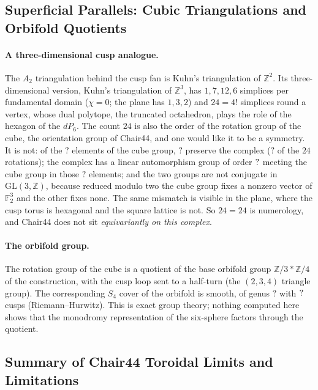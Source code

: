 \documentclass[11pt,a4paper]{article}
\newcommand{\SSChCoverGenus}{?}\newcommand{\SSChECoef}{?}
\newcommand{\SSChKuhnGroup}{?}\newcommand{\SSChKuhnMeet}{?}
\newcommand{\SSChKuhnPreserve}{?}\newcommand{\SSChKuhnRot}{?}
\newcommand{\ZZ}{\mathbb{Z}}
\newcommand{\GL}{\mathrm{GL}}
\theoremstyle{plain}
\theoremstyle{definition}
\begin{document}
\subsection{Superficial Parallels: Cubic Triangulations and Orbifold Quotients}
\label{sec:chair-nolink}

\paragraph{A three-dimensional cusp analogue.} The $A_2$ triangulation behind the cusp
fan is Kuhn's triangulation of $\ZZ^2$. Its three-dimensional version, Kuhn's
triangulation of $\ZZ^3$, has $1,7,12,6$ simplices per fundamental domain ($\chi=0$; the
plane has $1,3,2$) and $24=4!$ simplices round a vertex, whose dual polytope, the
truncated octahedron, plays the role of the hexagon of the $dP_6$. The count $24$ is
also the order of the rotation group of the cube, the orientation group of Chair44, and
one would like it to be a symmetry. It is not: of the $\SSChKuhnGroup{}$ elements of the
cube group, $\SSChKuhnPreserve{}$ preserve the complex ($\SSChKuhnRot{}$ of the $24$
rotations); the complex has a linear automorphism group of order $?{}$ meeting
the cube group in those $\SSChKuhnMeet{}$ elements; and the two groups are not conjugate
in $\GL(3,\ZZ)$, because reduced modulo two the cube group fixes a nonzero vector of
$\mathbb F_2^3$ and the other fixes none. The same mismatch is visible in the plane, where
the cusp torus is hexagonal and the square lattice is not. So $24=24$ is numerology, and
Chair44 does not sit \emph{equivariantly on this complex}.

\paragraph{The orbifold group.} The rotation group of the cube is a quotient of the base
orbifold group $\mathbb Z/3*\mathbb Z/4$ of the construction, with the cusp loop sent to
a half-turn (the $(2,3,4)$ triangle group). The corresponding $S_4$ cover of the orbifold
is smooth, of genus $\SSChCoverGenus{}$ with $?{}$ cusps
(Riemann--Hurwitz). This is exact group theory; nothing computed here shows that the
monodromy representation of the six-sphere factors through the quotient.

\subsection{Summary of Chair44 Toroidal Limits and Limitations}
\end{document}
